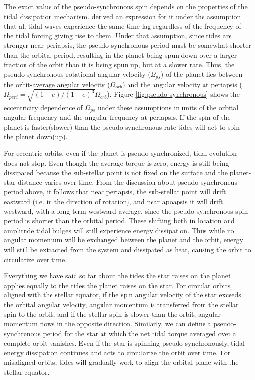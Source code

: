 The exact value of the pseudo-synchronous spin depends on the properties of the
tidal dissipation mechanism. \citep{Hut_81} derived an expression for it under
the assumption that all tidal waves experience the same time lag regardless of
the frequency of the tidal forcing giving rise to them. Under that assumption,
since tides are stronger near periapsis, the pseudo-synchronous period must be
somewhat shorter than the orbital period, resulting in the planet being
spun-down over a larger fraction of the orbit than it is being spun up, but at a
slower rate. Thus, the \citet{Hut_81} pseudo-synchronous rotational angular
velocity ($\Omega_{ps}$) of the planet lies between the orbit-average angular
velocity ($\Omega_{orb}$) and the angular velocity at periapsis ($\Omega_{peri}
= \sqrt{(1+e)/(1-e)^3}\Omega_{orb}$). Figure \ref{fig:pseudo-synchronous} shows
the eccentricity dependence of $\Omega_{ps}$ under these assumptions in units of
the orbital angular frequency and the angular frequency at periapsis. If the
spin of the planet is faster(slower) than the pseudo-synchronous rate tides will
act to spin the planet down(up).

For eccentric orbits, even if the planet is pseudo-synchronized, tidal evolution
does not stop. Even though the average torque is zero, energy is still being
dissipated because the sub-stellar point is not fixed on the surface and the
planet-star distance varies over time. From the discussion about
pseudo-synchronous period above, it follows that near periapsis, the sub-stellar
point will drift eastward (i.e. in the direction of rotation), and near apoapsis
it will drift westward, with a long-term westward average, since the
pseudo-synchronous spin period is shorter than the orbital period. These
shifting both in location and amplitude tidal bulges will still experience
energy dissipation. Thus while no angular momentum will be exchanged between the
planet and the orbit, energy will still be extracted from the system and
dissipated as heat, causing the orbit to circularize over time.

Everything we have said so far about the tides the star raises on the planet
applies equally to the tides the planet raises on the star. For circular orbits,
aligned with the stellar equator, if the spin angular velocity of the star
exceeds the orbital angular velocity, angular momentum is transferred from the
stellar spin to the orbit, and if the stellar spin is slower than the orbit,
angular momentum flows in the opposite direction. Similarly, we can define a
pseudo-synchronous period for the star at which the net tidal torque averaged
over a complete orbit vanishes. Even if the star is spinning
pseudo-synchronously, tidal energy dissipation continues and acts to circularize
the orbit over time. For misaligned orbits, tides will gradually work to align
the orbital plane with the stellar equator.

